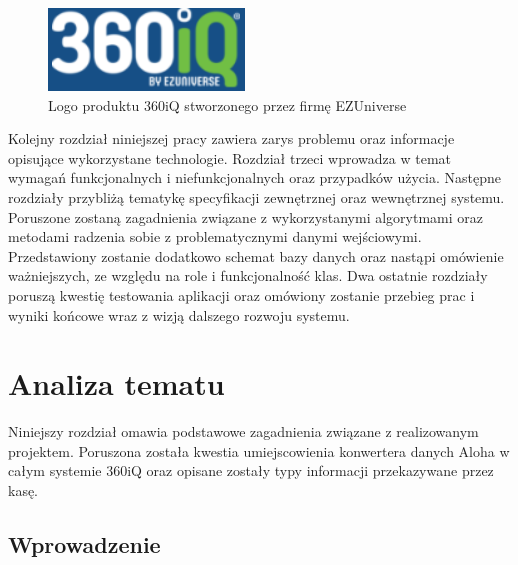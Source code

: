 \documentclass[a4paper]{book}
\begin{document}
\begin{figure}[h]
	\centering
	\includegraphics[width=\textwidth]{./img/360iQ.png}
	\caption{Logo produktu 360iQ stworzonego przez firmę EZUniverse}
	\label{fig:360iq}
\end{figure}
Kolejny rozdział niniejszej pracy zawiera zarys problemu oraz informacje opisujące wykorzystane technologie. Rozdział trzeci wprowadza w temat wymagań funkcjonalnych i niefunkcjonalnych oraz przypadków użycia. Następne rozdziały przybliżą tematykę specyfikacji zewnętrznej oraz wewnętrznej systemu. Poruszone zostaną zagadnienia związane z wykorzystanymi algorytmami oraz metodami radzenia sobie z problematycznymi danymi wejściowymi. Przedstawiony zostanie dodatkowo schemat bazy danych oraz nastąpi omówienie ważniejszych, ze względu na role i funkcjonalność klas. Dwa ostatnie rozdziały poruszą kwestię testowania aplikacji oraz omówiony zostanie przebieg prac i wyniki końcowe wraz z wizją dalszego rozwoju systemu. 

\chapter{Analiza tematu}
Niniejszy rozdział omawia podstawowe zagadnienia związane z realizowanym projektem. Poruszona została kwestia umiejscowienia konwertera danych Aloha w całym systemie 360iQ oraz opisane zostały typy informacji przekazywane przez kasę.
\section{Wprowadzenie}
\end{document}
